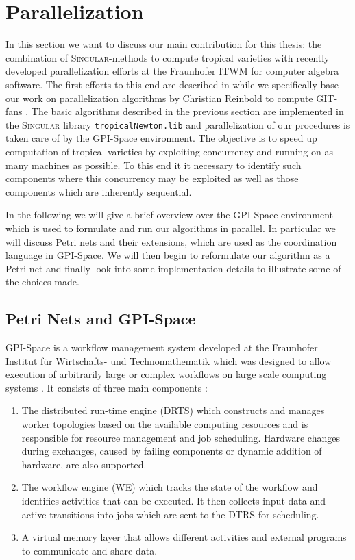 \documentclass[
  paper=a4,
  titlepage,
  bibliography=totoc,
  listof=totoc,
  pagesize=pdftex
]{scrartcl}
\numberwithin{figure}{section}
\numberwithin{equation}{section}
\numberwithin{table}{section}
\theoremstyle{definition}
\numberwithin{definition}{section}
\begin{document}
\section{Parallelization}

In this section we want to discuss our main contribution for this thesis: the combination
of \textsc{Singular}-methods to compute tropical varieties with recently developed
parallelization efforts at the Fraunhofer ITWM for computer algebra software. The first
efforts to this end are described in \cite{towardsParallel} while we specifically base our
work on parallelization algorithms by Christian Reinbold to compute GIT-fans
\cite{reinboldGitFan}. The basic algorithms described in the previous section are
implemented in the \textsc{Singular} library \texttt{tropicalNewton.lib}
\cite{tropNewtLib} and parallelization of our procedures is taken care of by the GPI-Space
environment. The objective is to speed up computation of tropical varieties by exploiting
concurrency and running on as many machines as possible. To this end it it necessary to
identify such components where this concurrency may be exploited as well as those
components which are inherently sequential.

In the following we will give a brief overview over the GPI-Space environment which is
used to formulate and run our algorithms in parallel. In particular we will discuss Petri
nets and their extensions, which are used as the coordination language in GPI-Space.
We will then begin to reformulate our algorithm as a Petri net and finally look into some
implementation details to illustrate some of the choices made.

\subsection{Petri Nets and GPI-Space}

GPI-Space is a workflow management system developed at the Fraunhofer Institut für
Wirtschafts- und Technomathematik which was designed to allow execution of arbitrarily
large or complex workflows on large scale computing systems \cite{gpispace}. It consists
of three main components \cite[Section~4.1]{reinboldGitFan}:
\begin{enumerate}[label=\arabic*.]
  \item The distributed run-time engine (DRTS) which constructs and manages worker
    topologies based on the available computing resources and is responsible for resource
    management and job scheduling. Hardware changes during exchanges, caused by failing
    components or dynamic addition of hardware, are also supported.
  \item The workflow engine (WE) which tracks the state of the workflow and identifies
    activities that can be executed. It then collects input data and active transitions
    into jobs which are sent to the DTRS for scheduling.
  \item A virtual memory layer that allows different activities and external programs to
    communicate and share data.
\end{enumerate}
\end{document}
